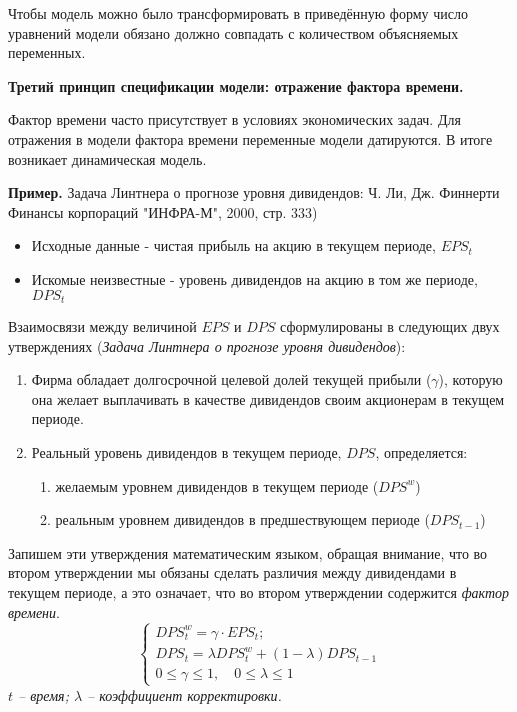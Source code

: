 \documentclass[12pt,a4paper]{article}
\begin{document}
Чтобы модель можно было трансформировать в приведённую форму число уравнений модели обязано должно совпадать с количеством объясняемых переменных.

\textbf{Третий принцип спецификации модели: отражение фактора времени.}

Фактор времени часто присутствует в условиях экономических задач. Для отражения в модели фактора времени переменные модели датируются. В итоге возникает динамическая модель.

\textbf{Пример.} Задача Линтнера о прогнозе уровня дивидендов: Ч. Ли, Дж. Финнерти Финансы корпораций "ИНФРА-М", 2000, стр. 333)
\begin{itemize}
\item Исходные данные - чистая прибыль на акцию в текущем периоде, $EPS_t$
\item Искомые неизвестные - уровень дивидендов на акцию в том же периоде, $DPS_t$
\end{itemize}

Взаимосвязи между величиной $EPS$ и $DPS$ сформулированы в следующих двух утверждениях (\textit{Задача Линтнера о прогнозе уровня дивидендов}):
\begin{enumerate}
\item Фирма обладает долгосрочной целевой долей текущей прибыли ($\gamma$), которую она желает выплачивать в качестве дивидендов своим акционерам в текущем периоде.
\item Реальный уровень дивидендов в текущем периоде, $DPS$, определяется:
	\begin{enumerate}
	\item желаемым уровнем дивидендов в текущем периоде ($DPS^w$)
	\item реальным уровнем дивидендов в предшествующем периоде ($DPS_{t-1}$)
	\end{enumerate}
\end{enumerate}

Запишем эти утверждения математическим языком, обращая внимание, что во втором утверждении мы обязаны сделать различия между дивидендами в текущем периоде, а это означает, что во втором утверждении содержится \textit{фактор времени}.
\begin{equation}
\begin{cases}
DPS_t^w = \gamma \cdot EPS_t; \\
DPS_t = \lambda DPS_t^w + (1 - \lambda) DPS_{t-1} \\
0 \leqslant \gamma \leqslant 1, \quad 0 \leqslant \lambda \leqslant 1
\end{cases}
\end{equation}
\textit{$t$ -- время; $\lambda$ -- коэффициент корректировки.}
\end{document}
